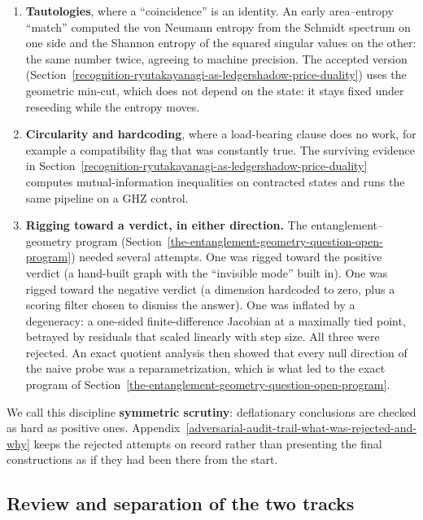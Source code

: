 \documentclass[11pt]{article}
\theoremstyle{definition}
\providecommand{\tightlist}{\setlength{\itemsep}{0pt}\setlength{\parskip}{0pt}}
\begin{document}
\begin{enumerate}\tightlist
\item \textbf{Tautologies}, where a ``coincidence'' is an identity. An early area--entropy ``match'' computed the von
  Neumann entropy from the Schmidt spectrum on one side and the Shannon entropy of the squared singular values on the
  other: the same number twice, agreeing to machine precision. The accepted version
  (Section~\ref{recognition-ryutakayanagi-as-ledgershadow-price-duality}) uses the geometric min-cut, which does not
  depend on the state: it stays fixed under reseeding while the entropy moves.
\item \textbf{Circularity and hardcoding}, where a load-bearing clause does no work, for example a compatibility flag
  that was constantly true. The surviving evidence in Section~\ref{recognition-ryutakayanagi-as-ledgershadow-price-duality}
  computes mutual-information inequalities on contracted states and runs the same pipeline on a GHZ control.
\item \textbf{Rigging toward a verdict, in either direction.} The entanglement--geometry program
  (Section~\ref{the-entanglement-geometry-question-open-program}) needed several attempts. One was rigged toward the
  positive verdict (a hand-built graph with the ``invisible mode'' built in). One was rigged toward the negative verdict
  (a dimension hardcoded to zero, plus a scoring filter chosen to dismiss the answer). One was inflated by a degeneracy:
  a one-sided finite-difference Jacobian at a maximally tied point, betrayed by residuals that scaled linearly with
  step size. All three were rejected. An exact quotient analysis then showed that every null direction of the naive
  probe was a reparametrization, which is what led to the exact program of Section~\ref{the-entanglement-geometry-question-open-program}.
\end{enumerate}

We call this discipline \textbf{symmetric scrutiny}: deflationary conclusions are checked as hard as positive ones.
Appendix~\ref{adversarial-audit-trail-what-was-rejected-and-why} keeps the rejected attempts on record rather than
presenting the final constructions as if they had been there from the start.

\subsection{Review and separation of the two tracks}\label{adversarial-review-and-the-anti-contamination-guard}
\end{document}
